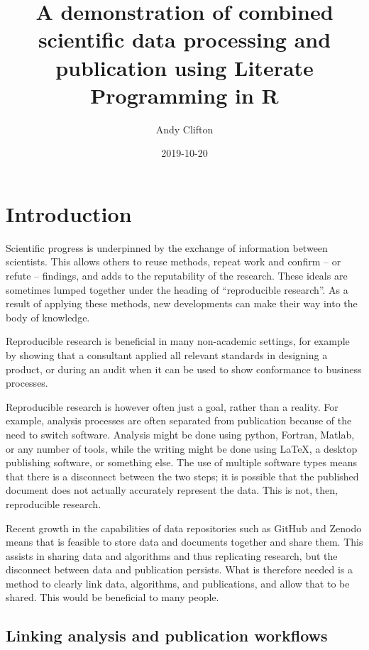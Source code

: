 \documentclass[11pt,]{article}
\title{A demonstration of combined scientific data processing and publication using Literate Programming in R}
\author{Andy Clifton}
\date{2019-10-20}
\begin{document}
\maketitle

{
\hypersetup{linkcolor=black}
\setcounter{tocdepth}{2}
\tableofcontents
}
\hypertarget{sec:intro}{%
\section{Introduction}\label{sec:intro}}

Scientific progress is underpinned by the exchange of information between scientists. This allows others to reuse methods, repeat work and confirm -- or refute -- findings, and adds to the reputability of the research. These ideals are sometimes lumped together under the heading of ``reproducible research''. As a result of applying these methods, new developments can make their way into the body of knowledge.

Reproducible research is beneficial in many non-academic settings, for example by showing that a consultant applied all relevant standards in designing a product, or during an audit when it can be used to show conformance to business processes.

Reproducible research is however often just a goal, rather than a reality. For example, analysis processes are often separated from publication because of the need to switch software. Analysis might be done using python, Fortran, Matlab, or any number of tools, while the writing might be done using LaTeX, a desktop publishing software, or something else. The use of multiple software types means that there is a disconnect between the two steps; it is possible that the published document does not actually accurately represent the data. This is not, then, reproducible research.

Recent growth in the capabilities of data repositories such as GitHub and Zenodo means that is feasible to store data and documents together and share them. This assists in sharing data and algorithms and thus replicating research, but the disconnect between data and publication persists. What is therefore needed is a method to clearly link data, algorithms, and publications, and allow that to be shared. This would be beneficial to many people.

\hypertarget{linking-analysis-and-publication-workflows}{%
\subsection{Linking analysis and publication workflows}\label{linking-analysis-and-publication-workflows}}
\end{document}
